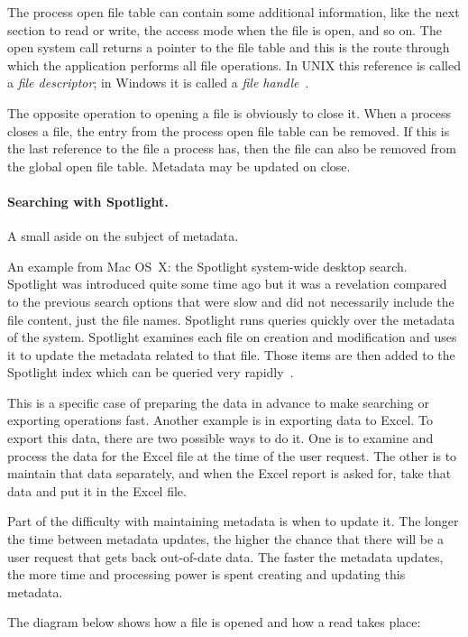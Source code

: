 The process open file table can contain some additional information, like the next section to read or write, the access mode when the file is open, and so on. The open system call returns a pointer to the file table and this is the route through which the application performs all file operations. In UNIX this reference is called a \textit{file descriptor}; in Windows it is called a \textit{file handle}~\cite{osc}.

The opposite operation to opening a file is obviously to close it. When a process closes a file, the entry from the process open file table can be removed. If this is the last reference to the file a process has, then the file can also be removed from the global open file table. Metadata may be updated on close.

\paragraph{Searching with Spotlight.}

A small aside on the subject of metadata.

An example from Mac OS~X: the Spotlight system-wide desktop search. Spotlight was introduced quite some time ago but it was a revelation compared to the previous search options that were slow and did not necessarily include the file content, just the file names. Spotlight runs queries quickly over the metadata of the system. Spotlight examines each file on creation and modification and uses it to update the metadata related to that file. Those items are then added to the Spotlight index which can be queried very rapidly~\cite{spotlight}.

This is a specific case of preparing the data in advance to make searching or exporting operations fast. Another example is in exporting data to Excel. To export this data, there are two possible ways to do it. One is to examine and process the data for the Excel file at the time of the user request. The other is to maintain that data separately, and when the Excel report is asked for, take that data and put it in the Excel file.

Part of the difficulty with maintaining metadata is when to update it. The longer the time between metadata updates, the higher the chance that there will be a user request that gets back out-of-date data. The faster the metadata updates, the more time and processing power is spent creating and updating this metadata.

The diagram below shows how a file is opened and how a read takes place:

